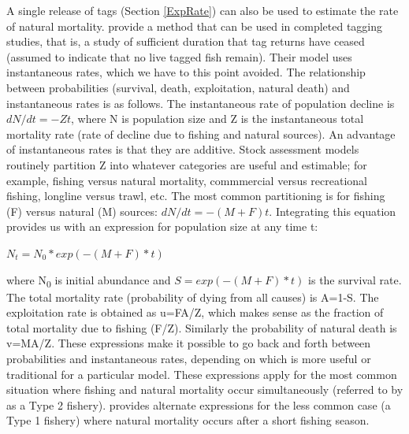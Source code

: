 \documentclass[
]{krantz}
\begin{document}
A single release of tags (Section \ref{ExpRate}) can also be used to estimate the rate of natural mortality. \citet{hearn.etal1987} provide a method that can be used in completed tagging studies, that is, a study of sufficient duration that tag returns have ceased (assumed to indicate that no live tagged fish remain). Their model uses instantaneous rates, which we have to this point avoided. The relationship between probabilities (survival, death, exploitation, natural death) and instantaneous rates is as follows. The instantaneous rate of population decline is \(dN/dt = -Zt\), where N is population size and Z is the instantaneous total mortality rate (rate of decline due to fishing and natural sources). An advantage of instantaneous rates is that they are additive. Stock assessment models routinely partition Z into whatever categories are useful and estimable; for example, fishing versus natural mortality, commmercial versus recreational fishing, longline versus trawl, etc. The most common partitioning is for fishing (F) versus natural (M) sources: \(dN/dt = -(M+F)t\). Integrating this equation provides us with an expression for population size at any time t:

\(N_t = N_0 * exp(-(M+F)*t)\)

where N\textsubscript{0} is initial abundance and \(S=exp(-(M+F)*t)\) is the survival rate. The total mortality rate (probability of dying from all causes) is A=1-S. The exploitation rate is obtained as u=FA/Z, which makes sense as the fraction of total mortality due to fishing (F/Z). Similarly the probability of natural death is v=MA/Z. These expressions make it possible to go back and forth between probabilities and instantaneous rates, depending on which is more useful or traditional for a particular model. These expressions apply for the most common situation where fishing and natural mortality occur simultaneously (referred to by \citet{ricker1975} as a Type 2 fishery). \citet{ricker1975} provides alternate expressions for the less common case (a Type 1 fishery) where natural mortality occurs after a short fishing season.
\end{document}
